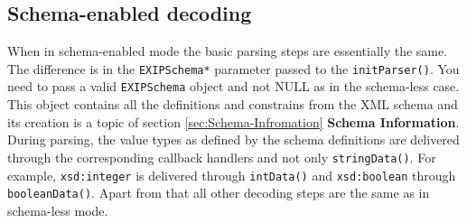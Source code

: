 \subsection{Schema-enabled decoding}
When in schema-enabled mode the basic parsing steps are essentially the same.
The difference is in the \texttt{EXIPSchema*} parameter passed to the \texttt{initParser()}.
You need to pass a valid \texttt{EXIPSchema} object and not NULL as in the schema-less
case. This object contains all the definitions and constrains from the XML schema and
its creation is a topic of section \ref{sec:Schema-Infromation} \textbf{Schema Information}.
During parsing, the value types as defined by the schema definitions
are delivered through the corresponding callback handlers and not only \texttt{stringData()}.
For example, \texttt{xsd:integer} is delivered through \texttt{intData()} and
\texttt{xsd:boolean} through \texttt{booleanData()}. Apart from that all other decoding steps
are the same as in schema-less mode.